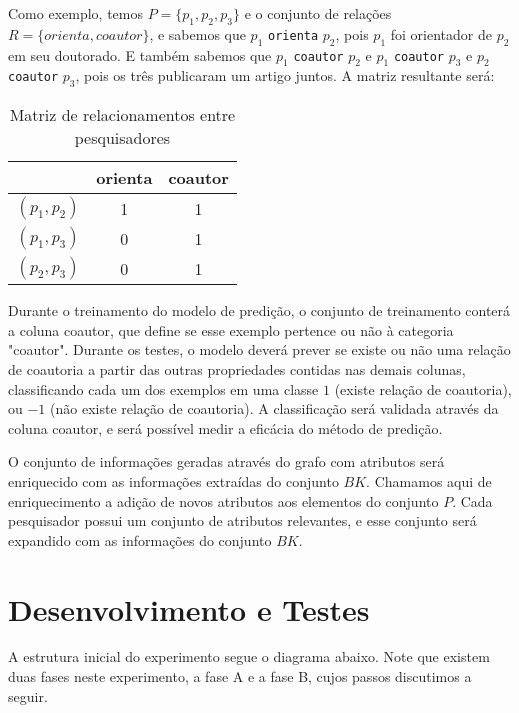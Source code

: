 Como exemplo, temos $P = \{ p_1, p_2, p_3 \}$ e o conjunto de relações $R = \{ orienta, coautor \}$, e sabemos que $p_1$ \texttt{orienta} $p_2$, pois $p_1$ foi orientador de $p_2$ em seu doutorado. E também sabemos que $p_1$ \texttt{coautor} $p_2$ e $p_1$ \texttt{coautor} $p_3$ e $p_2$ \texttt{coautor} $p_3$, pois os três publicaram um artigo juntos. A matriz resultante será:

\begin{table}[h!]
    \centering
    \begin{tabular}{|c|c|c|}
     \hline
      & orienta & coautor \\
     \hline\hline
     $(p_1, p_2)$ & 1 & 1  \\
     \hline
     $(p_1, p_3)$ & 0 & 1  \\
     \hline
     $(p_2, p_3)$ & 0 & 1  \\
     \hline
    \end{tabular}
    \caption{Matriz de relacionamentos entre pesquisadores}
    \label{matriz-relacoes}
\end{table}

Durante o treinamento do modelo de predição, o conjunto de treinamento conterá a coluna coautor, que define se esse exemplo pertence ou não à categoria "coautor". Durante os testes, o modelo deverá prever se existe ou não uma relação de coautoria a partir das outras propriedades contidas nas demais colunas, classificando cada um dos exemplos em uma classe $1$ (existe relação de coautoria), ou $-1$ (não existe relação de coautoria). A classificação será validada através da coluna coautor, e será possível medir a eficácia do método de predição.


O conjunto de informações geradas através do grafo com atributos será enriquecido com as informações extraídas do conjunto $BK$. Chamamos aqui de enriquecimento a adição de novos atributos aos elementos do conjunto $P$. Cada pesquisador possui um conjunto de atributos relevantes, e esse conjunto será expandido com as informações do conjunto $BK$.


\section{Desenvolvimento e Testes}
\label{sec:desenvolvimento-testes}

A estrutura inicial do experimento segue o diagrama abaixo. Note que existem duas fases neste experimento, a fase A e a fase B, cujos passos discutimos a seguir.

